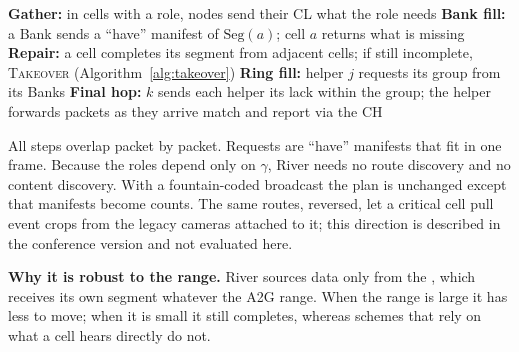 \begin{algorithm}[t]\caption{River execution (after the UAV leaves the cluster)}\label{alg:exec}
\begin{algorithmic}[1]\footnotesize
\STATE \textbf{Gather:} in cells with a role, nodes send their CL what the role needs
\STATE \textbf{Bank fill:} a Bank sends a ``have'' manifest of $\mathrm{Seg}(a)$; \spine{} cell $a$ returns what is missing
\STATE \textbf{Repair:} a \spine{} cell completes its segment from adjacent cells; if still incomplete, \textsc{Takeover}
(Algorithm~\ref{alg:takeover})
\STATE \textbf{Ring fill:} helper $j$ requests its group from its Banks
\REPEAT
\STATE \textbf{Final hop:} $k$ sends each helper its lack within the group; the helper forwards packets as they arrive
\STATE match and report via the CH
\end{algorithmic}
\end{algorithm}

All steps overlap packet by packet. Requests are ``have'' manifests that fit in one frame. Because the roles depend only
on $\gamma$, River needs no route discovery and no content discovery. With a fountain-coded broadcast the plan is
unchanged except that manifests become counts. The same routes, reversed, let a critical cell pull event crops from the
legacy cameras attached to it; this direction is described in the conference version and not evaluated here.

\textbf{Why it is robust to the range.} River sources data only from the \spine, which receives its own segment whatever
the A2G range. When the range is large it has less to move; when it is small it still completes, whereas schemes that
rely on what a cell hears directly do not.

